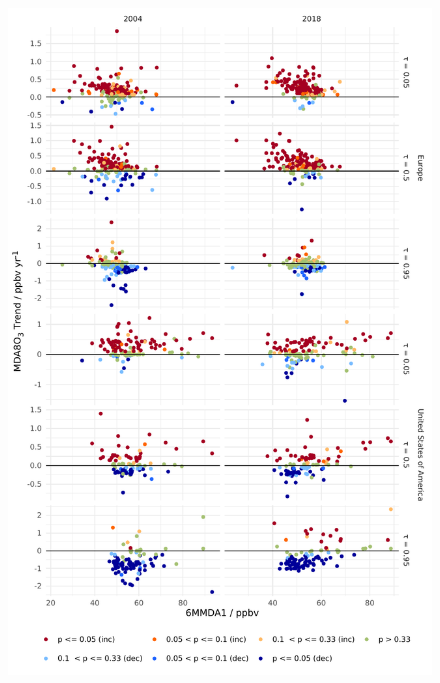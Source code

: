 \documentclass{article}
\begin{document}
\begin{figure}[p]
\centering
\includegraphics[height=0.75\textheight]{figures/si_figures/fS21_mda8_sig_mda8_6mmda1.pdf}
\caption{}
\label{si_fig:mda8_sig_mda8_6mmda1}
\end{figure}
\clearpage
\end{document}
